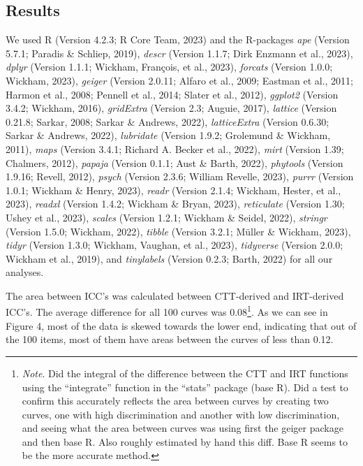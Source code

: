 \documentclass[
  jou]{apa6}
\begin{document}
\hypertarget{results-1}{%
\subsection{Results}\label{results-1}}

We used R (Version 4.2.3; R Core Team, 2023) and the R-packages \emph{ape} (Version 5.7.1; Paradis \& Schliep, 2019), \emph{descr} (Version 1.1.7; Dirk Enzmann et al., 2023), \emph{dplyr} (Version 1.1.1; Wickham, François, et al., 2023), \emph{forcats} (Version 1.0.0; Wickham, 2023), \emph{geiger} (Version 2.0.11; Alfaro et al., 2009; Eastman et al., 2011; Harmon et al., 2008; Pennell et al., 2014; Slater et al., 2012), \emph{ggplot2} (Version 3.4.2; Wickham, 2016), \emph{gridExtra} (Version 2.3; Auguie, 2017), \emph{lattice} (Version 0.21.8; Sarkar, 2008; Sarkar \& Andrews, 2022), \emph{latticeExtra} (Version 0.6.30; Sarkar \& Andrews, 2022), \emph{lubridate} (Version 1.9.2; Grolemund \& Wickham, 2011), \emph{maps} (Version 3.4.1; Richard A. Becker et al., 2022), \emph{mirt} (Version 1.39; Chalmers, 2012), \emph{papaja} (Version 0.1.1; Aust \& Barth, 2022), \emph{phytools} (Version 1.9.16; Revell, 2012), \emph{psych} (Version 2.3.6; William Revelle, 2023), \emph{purrr} (Version 1.0.1; Wickham \& Henry, 2023), \emph{readr} (Version 2.1.4; Wickham, Hester, et al., 2023), \emph{readxl} (Version 1.4.2; Wickham \& Bryan, 2023), \emph{reticulate} (Version 1.30; Ushey et al., 2023), \emph{scales} (Version 1.2.1; Wickham \& Seidel, 2022), \emph{stringr} (Version 1.5.0; Wickham, 2022), \emph{tibble} (Version 3.2.1; Müller \& Wickham, 2023), \emph{tidyr} (Version 1.3.0; Wickham, Vaughan, et al., 2023), \emph{tidyverse} (Version 2.0.0; Wickham et al., 2019), and \emph{tinylabels} (Version 0.2.3; Barth, 2022) for all our analyses.

The area between ICC's was calculated between CTT-derived and IRT-derived ICC's. The average difference for all 100 curves was 0.08\footnote{\emph{Note}. Did the integral of the difference between the CTT and IRT functions using the ``integrate'' function in the ``stats'' package (base R). Did a test to confirm this accurately reflects the area between curves by creating two curves, one with high discrimination and another with low discrimination, and seeing what the area between curves was using first the geiger package and then base R. Also roughly estimated by hand this diff. Base R seems to be the more accurate method.}. As we can see in Figure 4, most of the data is skewed towards the lower end, indicating that out of the 100 items, most of them have areas between the curves of less than 0.12.
\end{document}
